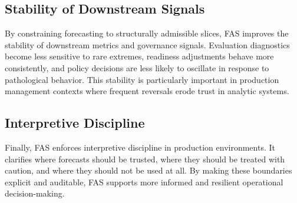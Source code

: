 \subsection{Stability of Downstream Signals}

By constraining forecasting to structurally admissible slices, FAS improves the
stability of downstream metrics and governance signals. Evaluation diagnostics
become less sensitive to rare extremes, readiness adjustments behave more
consistently, and policy decisions are less likely to oscillate in response to
pathological behavior. This stability is particularly important in production
management contexts where frequent reversals erode trust in analytic systems.

\subsection{Interpretive Discipline}

Finally, FAS enforces interpretive discipline in production environments. It
clarifies where forecasts should be trusted, where they should be treated with
caution, and where they should not be used at all. By making these boundaries
explicit and auditable, FAS supports more informed and resilient operational
decision-making.
